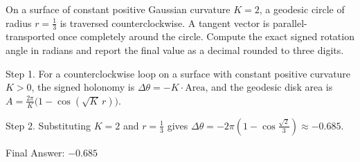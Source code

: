On a surface of constant positive Gaussian curvature $K=2$, a geodesic circle of radius $r=\tfrac{1}{3}$ is traversed counterclockwise. A tangent vector is parallel-transported once completely around the circle. Compute the exact signed rotation angle in radians and report the final value as a decimal rounded to three digits.

Step 1. For a counterclockwise loop on a surface with constant positive curvature $K>0$, the signed holonomy is $\Delta\theta=-K\cdot\text{Area}$, and the geodesic disk area is $A=\tfrac{2\pi}{K}\bigl(1-\cos(\sqrt{K}\,r)\bigr)$.

Step 2. Substituting $K=2$ and $r=\tfrac{1}{3}$ gives $\Delta\theta=-2\pi\!\left(1-\cos\!\tfrac{\sqrt{2}}{3}\right)\approx -0.685$.

Final Answer: $-0.685$